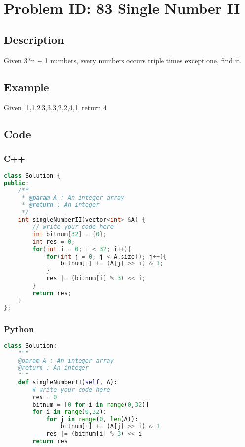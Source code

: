 \section{Problem ID: 83 Single Number II}
\subsection{Description}
Given 3*n + 1 numbers, every numbers occurs triple times except one, find it.

\subsection{Example}
Given [1,1,2,3,3,3,2,2,4,1] return 4

\subsection{Code}
\scriptsize
\subsubsection{C++}
\begin{lstlisting}[language=C++]
class Solution {
public:
	/**
	 * @param A : An integer array
	 * @return : An integer
	 */
    int singleNumberII(vector<int> &A) {
        // write your code here
        int bitnum[32] = {0};
        int res = 0;
        for(int i = 0; i < 32; i++){
            for(int j = 0; j < A.size(); j++){
                bitnum[i] += (A[j] >> i) & 1;
            }
            res |= (bitnum[i] % 3) << i;
        }
        return res;
    }
};
\end{lstlisting}

\subsubsection{Python}
\begin{lstlisting}[language=Python]
class Solution:
    """
	@param A : An integer array
	@return : An integer
    """
    def singleNumberII(self, A):
        # write your code here
        res = 0
        bitnum = [0 for i in range(0,32)]
        for i in range(0,32):
            for j in range(0, len(A)):
                bitnum[i] += (A[j] >> i) & 1
            res |= (bitnum[i] % 3) << i
        return res
\end{lstlisting}
\normalsize 